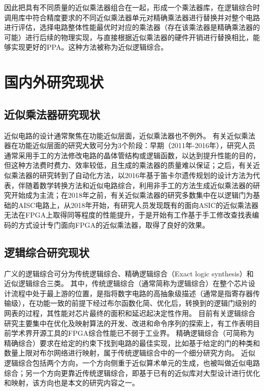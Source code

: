 因此把具有不同质量的近似乘法器组合在一起，形成一个乘法器库，在逻辑综合时调用库中符合精度要求的不同近似乘法器单元对精确乘法器进行替换并对整个电路进行评估，选择电路整体性能最优时对应的乘法器（存在该乘法器是精确乘法器的可能）进行后续的物理实现，与直接根据近似乘法器的硬件开销进行替换相比，能够实现更好的PPA。这种方法被称为近似逻辑综合。


\section{国内外研究现状}

\subsection{近似乘法器研究现状}

近似电路的设计通常聚焦在功能近似层面\cite{AC:ALS:survey}，近似乘法器也不例外。
有关近似乘法器在功能近似层面的研究大致可分为3个阶段：早期（2011年-2016年），研究人员通常采用手工的方法修改电路的晶体管结构\cite{AC:AM:IMPACT}或逻辑函数\cite{AC:AM:KMap}，以达到提升性能的目的，但这种方法费时费力、效率较低，且生成的乘法器的质量难以保证；之后，有关近似乘法器的研究转到了自动化方法，以2016年基于笛卡尔遗传规划的设计方法为代表\cite{AC:AM:CGP_2016}，伴随着数学转换方法\cite{AC:AM:OU}和近似电路综合\cite{AC:ALS:ALSRAC}，利用非手工的方法生成近似乘法器的研究开始成为主流；在2018年之前，有关近似乘法器的研究多数集中在以逻辑门为基础的AISC电路上，从2018年开始，有研究人员发现既有的面向ASIC的近似乘法器无法在FPGA上取得同等程度的性能提升，于是开始有工作基于手工修改查找表编码的方式设计专门面向FPGA的近似乘法器，取得了良好的效果\cite{AC:AM:FPGA:SMApproxLib}。

\subsection{逻辑综合研究现状}

广义的逻辑综合可分为传统逻辑综合、精确逻辑综合（Exact logic synthesis）和近似逻辑综合三类。
其中，传统逻辑综合（通常简称为逻辑综合）在整个芯片设计流程中处于最上游的位置，是指将数字电路的高抽象级描述（通常是指寄存器传输级），在功能一致的前提下经过布尔函数化简、优化后，转换到的逻辑门级别的网表的过程，其性能对芯片最终的面积和延迟起决定性作用。
目前有关逻辑综合研究主要集中在优化及映射算法的开发、改进\cite{LS:Narrowing}和命令序列的探索上\cite{LS:Bulls-Eye}，有工作表明目前学术界开源工具的FPGA综合性能已不弱于工业界\cite{LS:Narrowing}。
精确逻辑综合（可简称为精确综合）要求在给定的约束下找到电路的最佳实现，比如基于给定的门的种类和数量上限对布尔网络进行映射\cite{LS:exact_syn}，属于传统逻辑综合中的一个细分研究方向。
近似逻辑综合包括两个方向，一个方向侧重于近似算术单元的生成，也被叫做近似电路综合；另一个方向更靠近传统逻辑综合，即基于已有的近似库对大型设计进行优化和映射，该方向也是本文的研究内容之一。


